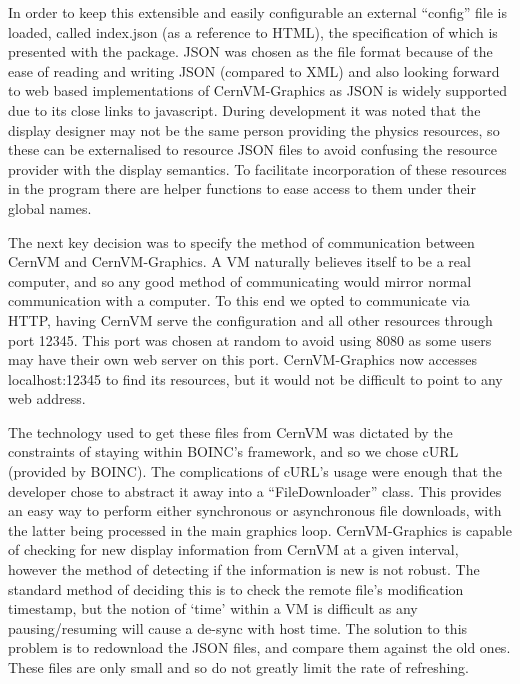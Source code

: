\documentclass[twocolumn,aps]{revtex4}
\newcommand{\cernvm}{CernVM}
\newcommand{\cernvmgraphics}{\cernvm{}-Graphics}
\newcommand{\boinc}{BOINC}
\newcommand{\curl}{cURL}
\newcommand{\json}{JSON}
\newcommand{\vmport}{12345}
\begin{document}
    In order to keep this extensible and easily configurable an external
    ``config'' file is loaded, called index.json (as a reference to HTML),
    the specification of which is presented with the package.  \json{} was 
    chosen as the file format because of the ease of reading and writing 
    \json{} (compared to XML) and also looking forward to web based 
    implementations of \cernvmgraphics{} as \json{} is widely supported due 
    to its close links to javascript. During development it was noted that
    the display designer may not be the same person providing the physics
    resources, so these can be externalised to resource \json{} files to
    avoid confusing the resource provider with the display semantics.
    To facilitate incorporation of these resources in the program there are 
    helper functions to ease access to them under their global names.

    The next key decision was to specify the method of communication
    between \cernvm{} and \cernvmgraphics{}. A VM naturally believes itself
    to be a real computer, and so any good method of communicating would 
    mirror normal communication with a computer. To this end we opted to
    communicate via HTTP, having \cernvm{} serve the configuration and all
    other resources through port \vmport{}. This port was chosen at random
    to avoid using 8080 as some users may have their own web server on this
    port. \cernvmgraphics{} now accesses localhost:\vmport{} to find its
    resources, but it would not be difficult to point to any web address.

    The technology used to get these files from \cernvm{} was dictated by
    the constraints of staying within \boinc{}'s framework, and so we chose
    \curl{} (provided by \boinc{}). The complications of \curl{}'s usage
    were enough that the developer chose to abstract it away into a
    ``FileDownloader'' class. This provides an easy way to perform either
    synchronous or asynchronous file downloads, with the latter being
    processed in the main graphics loop. \cernvmgraphics{} is capable of 
    checking for new display information from \cernvm{} at a given interval,
    however the method of detecting if the information is new is not robust.
    The standard method of deciding this is to check the remote file's
    modification timestamp, but the notion of `time' within a VM is 
    difficult as any pausing/resuming will cause a de-sync with host time. 
    The solution to this problem is to redownload the \json{} files, and
    compare them against the old ones. These files are only small and so do
    not greatly limit the rate of refreshing.
\end{document}
